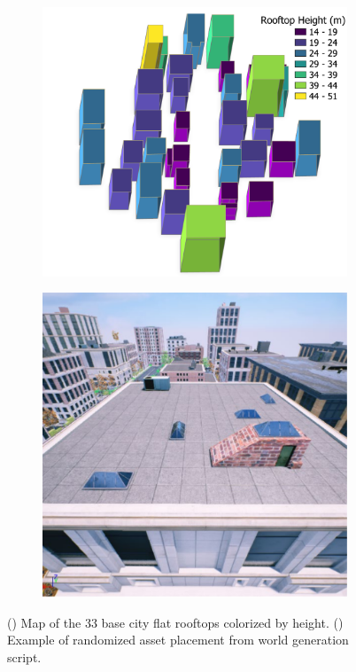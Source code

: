 \begin{figure}[ht]
 \centering
  \begin{subfigure}{.40\linewidth}
    \centering\includegraphics[page=1, width=.99\linewidth]{chapter_6_landingsim/figs/rooftop-map-3d.pdf}
    \caption{\label{fig:ch6_map_base_a}}
  \end{subfigure}
  \begin{subfigure}{.34\linewidth}
    \centering\includegraphics[page=1, width=.99\linewidth]{chapter_6_landingsim/figs/HistogramRoof.pdf}
    \caption{\label{fig:ch6_map_base_b}}
  \end{subfigure}
  \caption[Example simulated urban city]{ () Map of the 33 base city flat rooftops colorized by height. () Example of randomized asset placement from world generation script.}\label{fig:ch6_map_base}
\end{figure}

